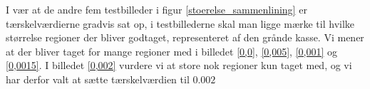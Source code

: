 I vær at de andre fem testbilleder i figur \ref{stoerelse_sammenlining}
er tærskelværdierne gradvis sat op, i testbillederne skal man ligge
mærke til hvilke størrelse regioner der bliver godtaget, representeret
af den grånde kasse. Vi mener at der bliver taget for mange regioner med
i billedet \ref{0,0}, \ref{0,005}, \ref{0,001} og \ref{0,0015}. I
billedet \ref{0,002} vurdere vi at store nok regioner kun taget med, og
vi har derfor valt at sætte tærskelværdien til $0.002$
 
\begin{figure}[!h]
    \setlength\fboxsep{0pt}
    \setlength\fboxrule{0.5pt}
    \centering
    \\
\end{figure}
